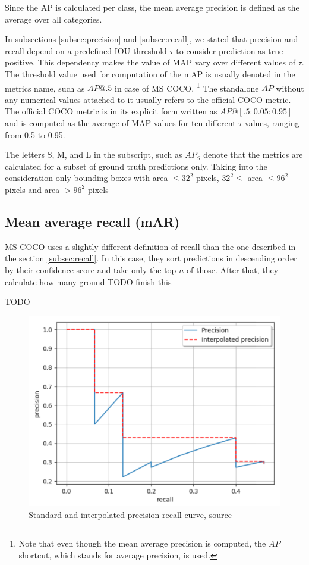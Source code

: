 Since the AP is calculated per class, the mean average precision is defined as the average over all categories.

In subsections \ref{subsec:precision} and \ref{subsec:recall}, we stated that precision and recall depend on a predefined IOU threshold $\tau$ to consider prediction as true positive. This dependency makes the value of MAP vary over different values of $\tau$. The threshold value used for computation of the mAP is usually denoted in the metrics name, such as $AP@.5$ in case of MS COCO. \footnote{Note that even though the mean average precision is computed, the $AP$ shortcut, which stands for average precision, is used.} The standalone $AP$ without any numerical values attached to it usually refers to the official COCO metric. The official COCO metric is in its explicit form written as $AP@[.5:0.05:0.95]$ and is computed as the average of MAP values for ten different $\tau$ values, ranging from 0.5 to 0.95.

The letters S, M,  and L in the subscript, such as $AP_S$ denote that the metrics are calculated for a subset of ground truth predictions only. Taking into the consideration only bounding boxes with area $\leq 32^2$ pixels, $32^2 \le $ area $ \leq 96^2$ pixels and area $> 96^2$ pixels

\subsection{Mean average recall (mAR)}
MS COCO uses a slightly different definition of recall than the one described in the section \ref{subsec:recall}. In this case, they sort predictions in descending order by their confidence score and take only the top $n$ of those. After that, they calculate how many ground TODO finish this

TODO


\begin{figure}
    \includegraphics[width = \linewidth]{images/PR-curve.png}
    \caption{Standard and interpolated precision-recall curve, source \cite{Padilla2020}}
    \label{fig:pr_curve}
\end{figure}



